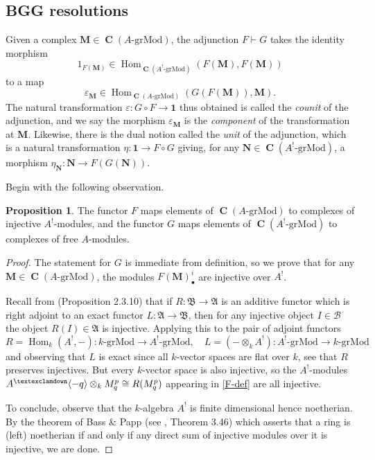 \documentclass[a4paper]{article}
\theoremstyle{definition}
\newtheorem{prop}[defn]{Proposition}
\theoremstyle{remark}
\newcommand{\grMod}{\ensuremath{\text{-grMod}}}
\DeclareMathOperator{\Hom}{\text{Hom}}
\DeclareMathOperator{\Ch}{\mathbf{C}}
\newcommand{\gnab}{{\textexclamdown}}
\begin{document}
\subsection{BGG resolutions}

Given a complex \(\mathbf{M}\in \Ch(A\grMod)\), the adjunction \(F\vdash G\)
takes the identity morphism
\[1_{F(\mathbf{M})}\in \Hom_{\Ch(A^!\grMod)}(F(\mathbf{M}), F(\mathbf{M}))\]
to a map 
\[\varepsilon_{\mathbf{M}}\in \Hom_{\Ch(A\grMod)}(G(F(\mathbf{M})), \mathbf{M}).\]
The natural transformation \(\varepsilon:G\circ F\rightarrow \mathbf{1}\) thus
obtained is called the \textit{counit} of the adjunction, and we say the
morphism \(\varepsilon_{\mathbf{M}}\) is the \textit{component} of the
transformation at \(\mathbf{M}\). Likewise, there is the dual notion called the
\textit{unit} of the adjunction, which is a natural transformation \(\eta:
\mathbf{1}\rightarrow F\circ G\) giving, for any \(\mathbf{N}\in
\Ch(A^!\grMod)\), a morphism \(\eta_\mathbf{N}:\mathbf{N}\rightarrow
F(G(\mathbf{N})).\) 

Begin with the following observation.

\begin{prop} \label{prop-F-2}
    The functor \(F\) maps elements of \(\Ch(A\grMod)\) to complexes of
    injective \(A^!\)-modules, and the functor \(G\) maps elements of
    \(\Ch(A^!\grMod)\) to complexes of free \(A\)-modules.
    \begin{proof}
        The statement for \(G\) is immediate from definition, so we prove that
        for any \(\mathbf{M}\in \Ch(A\grMod)\), the modules
        \(F(\mathbf{M})^i_\bullet\) are injective over \(A^!\).

        Recall from  (Proposition 2.3.10)
        that if \(R: \mathfrak{B}\rightarrow\mathfrak{A}\) is an additive functor
        which is right adjoint to an exact functor
        \(L:\mathfrak{A}\rightarrow\mathfrak{B}\), then for any injective object
        \(I\in \mathcal{B}\) the object \(R(I)\in \mathfrak{A}\) is injective.
        Applying this to the pair of adjoint functors 
        \[R= \Hom_k(A^!, -): k\grMod \rightarrow A^!\grMod , \quad L =
        (-\otimes_k A^!): A^!\grMod \rightarrow k\grMod\] 
        and observing that \(L\) is exact since all \(k\)-vector spaces are flat
        over \(k\), see that \(R\) preserves injectives. But every \(k\)-vector
        space is also injective, so the \(A^!\)-modules \(A^\gnab\langle -q
        \rangle \otimes_k M^p_q \cong R(M^p_q)\) appearing in \eqref{F-def} are
        all injective. 

        To conclude, observe that the \(k\)-algebra \(A^!\) is finite
        dimensional hence noetherian. By the theorem of Bass \& Papp (see
        , Theorem 3.46) which asserts that a ring
        is (left) noetherian if and only if any direct sum of injective
        modules over it is injective, we are done.
    \end{proof}
\end{prop}
\end{document}
